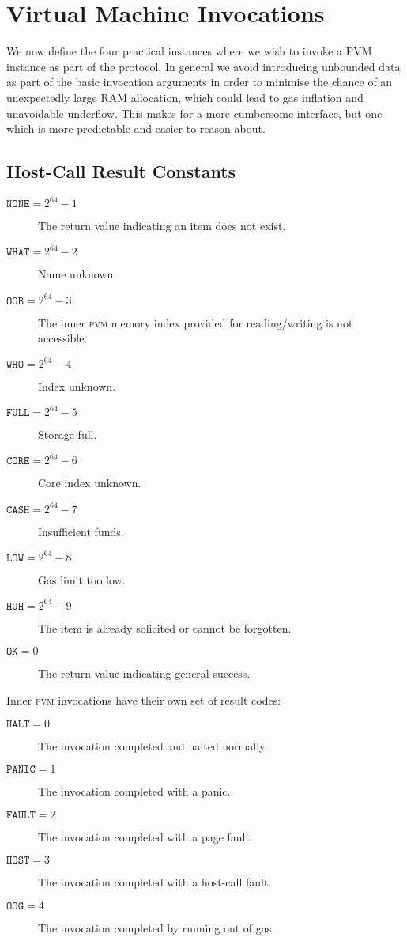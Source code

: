 \section{Virtual Machine Invocations}\label{sec:virtualmachineinvocations}

We now define the four practical instances where we wish to invoke a PVM instance as part of the protocol. In general we avoid introducing unbounded data as part of the basic invocation arguments in order to minimise the chance of an unexpectedly large RAM allocation, which could lead to gas inflation and unavoidable underflow. This makes for a more cumbersome interface, but one which is more predictable and easier to reason about.


\subsection{Host-Call Result Constants}

\begin{description}
  \item[$\mathtt{NONE} = 2^{64} - 1$] The return value indicating an item does not exist.
  \item[$\mathtt{WHAT} = 2^{64} - 2$] Name unknown.
  \item[$\mathtt{OOB} = 2^{64} - 3$] The inner \textsc{pvm} memory index provided for reading/writing is not accessible.
  \item[$\mathtt{WHO} = 2^{64} - 4$] Index unknown.
  \item[$\mathtt{FULL} = 2^{64} - 5$] Storage full.
  \item[$\mathtt{CORE} = 2^{64} - 6$] Core index unknown.
  \item[$\mathtt{CASH} = 2^{64} - 7$] Insufficient funds.
  \item[$\mathtt{LOW} = 2^{64} - 8$] Gas limit too low.
  \item[$\mathtt{HUH} = 2^{64} - 9$] The item is already solicited or cannot be forgotten.
  \item[$\mathtt{OK} = 0$] The return value indicating general success.
\end{description}

Inner \textsc{pvm} invocations have their own set of result codes:
\begin{description}
  \item[$\mathtt{HALT} = 0$] The invocation completed and halted normally.
  \item[$\mathtt{PANIC} = 1$] The invocation completed with a panic.
  \item[$\mathtt{FAULT} = 2$] The invocation completed with a page fault.
  \item[$\mathtt{HOST} = 3$] The invocation completed with a host-call fault.
  \item[$\mathtt{OOG} = 4$] The invocation completed by running out of gas.
\end{description}

